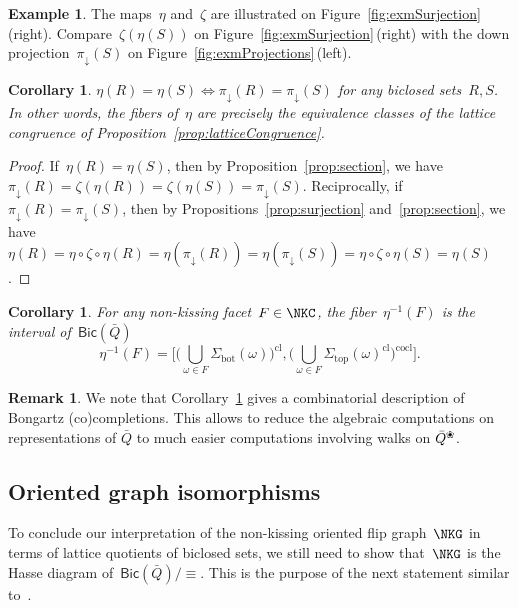 \documentclass{amsart}
\newtheorem{corollary}[theorem]{Corollary}
\theoremstyle{definition}
\newtheorem{example}[theorem]{Example}
\newtheorem{remark}[theorem]{Remark}
\newcommand{\fref}[1]{Figure~\ref{#1}} %
\newcommand{\blossom}{^\text{\ding{96}}} %
\renewcommand{\top}{\mathrm{top}} %
\newcommand{\bottom}{\mathrm{bot}} %
\newcommand{\closure}[1]{#1^{\mathrm{cl}}} %
\newcommand{\coclosure}[1]{#1^{\mathrm{cocl}}} %
\newcommand{\Bicl}[1]{\mathsf{Bic}(#1)} %
\newcommand{\projDown}{\pi_\downarrow} %
\begin{document}
\begin{example}
The maps~$\eta$ and~$\zeta$ are illustrated on \fref{fig:exmSurjection}\,(right).
Compare~$\zeta(\eta(S))$ on \fref{fig:exmSurjection}\,(right) with the down projection~$\projDown(S)$ on \fref{fig:exmProjections}\,(left).
\end{example}

\begin{corollary}
\label{coro:fibers}
$\eta(R) = \eta(S) \iff \projDown(R) = \projDown(S)$ for any biclosed sets~$R,S$. In other words, the fibers of~$\eta$ are precisely the equivalence classes of the lattice congruence of Proposition~\ref{prop:latticeCongruence}.
\end{corollary}

\begin{proof}
If~$\eta(R) = \eta(S)$, then by Proposition~\ref{prop:section}, we have~$\projDown(R) = \zeta(\eta(R)) = \zeta(\eta(S)) = \projDown(S)$.
Reciprocally, if~$\projDown(R) = \projDown(S)$, then by Propositions~\ref{prop:surjection} and~\ref{prop:section}, we have~$\eta(R) = \eta \circ \zeta \circ \eta(R) = \eta(\projDown(R)) = \eta(\projDown(S)) = \eta \circ \zeta \circ \eta(S) = \eta(S)$.
\end{proof}

\begin{corollary}\label{cor: interval biclosed}
For any non-kissing facet~$F \in \NKC$, the fiber~$\eta^{-1}(F)$ is the interval of~$\Bicl{\bar Q}$
\[
\eta^{-1}(F) = \bigg[ \closure{ \Big( \bigcup_{\omega \in F} \Sigma_\bottom(\omega) \Big) }, \coclosure{ \Big( \bigcup_{\omega \in F} \closure{\Sigma_\top(\omega)} \Big) } \bigg].
\]
\end{corollary}

\begin{remark}\label{rem: Bongartz}
 We note that Corollary~\ref{cor: interval biclosed} gives a combinatorial description of Bongartz (co)com\-pletions.
 This allows to reduce the algebraic computations on representations of $\bar Q$ to much easier computations involving walks on $\bar Q\blossom$.
\end{remark}


\subsection{Oriented graph isomorphisms}

To conclude our interpretation of the non-kissing oriented flip graph~$\NKG$ in terms of lattice quotients of biclosed sets, we still need to show that~$\NKG$ is the Hasse diagram of~$\Bicl{\bar Q}/{\equiv}$.
This is the purpose of the next statement similar to~\cite[Claim~8.10]{McConville}.
\end{document}
